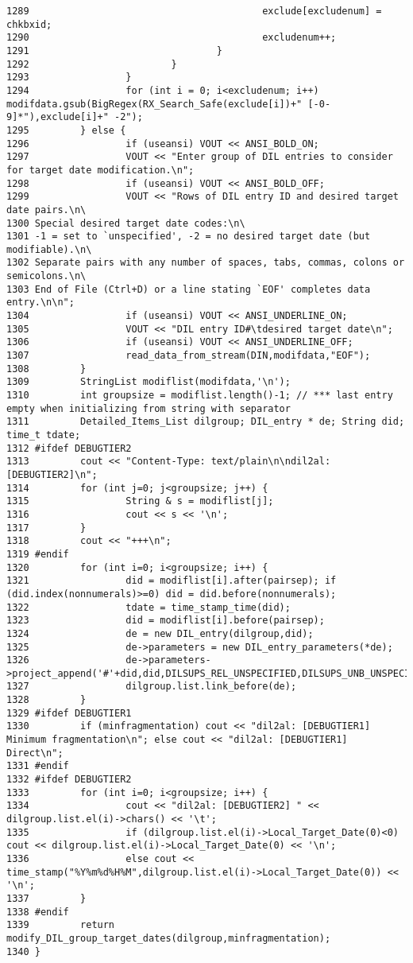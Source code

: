 \begin{verbatim}
1289                                         exclude[excludenum] = chkbxid;
1290                                         excludenum++;
1291                                 }
1292                         }
1293                 }
1294                 for (int i = 0; i<excludenum; i++) modifdata.gsub(BigRegex(RX_Search_Safe(exclude[i])+" [-0-9]*"),exclude[i]+" -2");
1295         } else {
1296                 if (useansi) VOUT << ANSI_BOLD_ON;
1297                 VOUT << "Enter group of DIL entries to consider for target date modification.\n";
1298                 if (useansi) VOUT << ANSI_BOLD_OFF;
1299                 VOUT << "Rows of DIL entry ID and desired target date pairs.\n\
1300 Special desired target date codes:\n\
1301 -1 = set to `unspecified', -2 = no desired target date (but modifiable).\n\
1302 Separate pairs with any number of spaces, tabs, commas, colons or semicolons.\n\
1303 End of File (Ctrl+D) or a line stating `EOF' completes data entry.\n\n";
1304                 if (useansi) VOUT << ANSI_UNDERLINE_ON;
1305                 VOUT << "DIL entry ID#\tdesired target date\n";
1306                 if (useansi) VOUT << ANSI_UNDERLINE_OFF;
1307                 read_data_from_stream(DIN,modifdata,"EOF");
1308         }
1309         StringList modiflist(modifdata,'\n');
1310         int groupsize = modiflist.length()-1; // *** last entry empty when initializing from string with separator
1311         Detailed_Items_List dilgroup; DIL_entry * de; String did; time_t tdate;
1312 #ifdef DEBUGTIER2
1313         cout << "Content-Type: text/plain\n\ndil2al: [DEBUGTIER2]\n";
1314         for (int j=0; j<groupsize; j++) {
1315                 String & s = modiflist[j];
1316                 cout << s << '\n';
1317         }
1318         cout << "+++\n";
1319 #endif
1320         for (int i=0; i<groupsize; i++) {
1321                 did = modiflist[i].after(pairsep); if (did.index(nonnumerals)>=0) did = did.before(nonnumerals);
1322                 tdate = time_stamp_time(did);
1323                 did = modiflist[i].before(pairsep);
1324                 de = new DIL_entry(dilgroup,did);
1325                 de->parameters = new DIL_entry_parameters(*de);
1326                 de->parameters->project_append('#'+did,did,DILSUPS_REL_UNSPECIFIED,DILSUPS_UNB_UNSPECIFIED,DILSUPS_BND_UNSPECIFIED,tdate,0,DILSUPS_URG_UNSPECIFIED,DILSUPS_PRI_UNSPECIFIED);
1327                 dilgroup.list.link_before(de);
1328         }
1329 #ifdef DEBUGTIER1
1330         if (minfragmentation) cout << "dil2al: [DEBUGTIER1] Minimum fragmentation\n"; else cout << "dil2al: [DEBUGTIER1] Direct\n";
1331 #endif
1332 #ifdef DEBUGTIER2
1333         for (int i=0; i<groupsize; i++) {
1334                 cout << "dil2al: [DEBUGTIER2] " << dilgroup.list.el(i)->chars() << '\t';
1335                 if (dilgroup.list.el(i)->Local_Target_Date(0)<0) cout << dilgroup.list.el(i)->Local_Target_Date(0) << '\n';
1336                 else cout << time_stamp("%Y%m%d%H%M",dilgroup.list.el(i)->Local_Target_Date(0)) << '\n';
1337         }
1338 #endif
1339         return modify_DIL_group_target_dates(dilgroup,minfragmentation);
1340 }
\end{verbatim}\normalsize 
